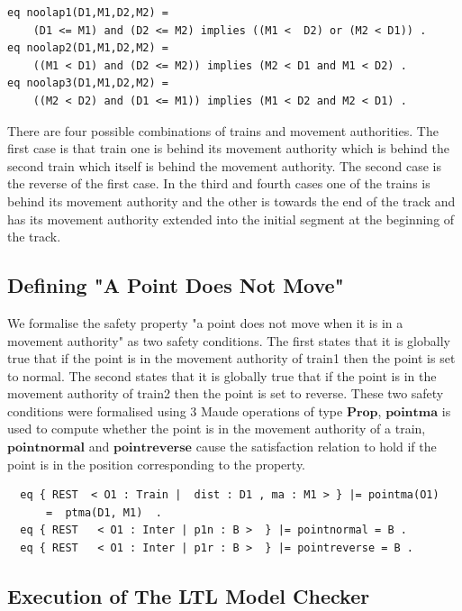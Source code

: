 \begin{lstlisting}[caption = The no overlap operations]
eq noolap1(D1,M1,D2,M2) = 
    (D1 <= M1) and (D2 <= M2) implies ((M1 <  D2) or (M2 < D1)) .  
eq noolap2(D1,M1,D2,M2) = 
    ((M1 < D1) and (D2 <= M2)) implies (M2 < D1 and M1 < D2) .
eq noolap3(D1,M1,D2,M2) = 
    ((M2 < D2) and (D1 <= M1)) implies (M1 < D2 and M2 < D1) .

\end{lstlisting}

There are four possible combinations of trains and movement authorities.  The first case is that train one is behind its movement authority which is behind the second train which itself is behind the movement authority. The second case is the reverse of the first case. In the third and fourth cases  one of the trains is behind its movement authority and the other is towards the end of the track and has its movement authority extended into the initial segment at the beginning of the track.


\subsection*{Defining "A Point Does Not Move"}
We formalise the safety property "a point does not move when it is in a movement authority" as two safety conditions. The first states that it is globally true that if the point is in the movement authority of train1 then the point is set to normal. The second states that it is globally true that if the point is in the movement authority of train2 then the point is set to reverse. These two safety conditions were formalised using 3 Maude operations of type $\mathbf{Prop}$, $\mathbf{pointma}$ is used to compute whether the point is in the movement authority of a train, $\mathbf{pointnormal}$ and $\mathbf{pointreverse}$ cause the satisfaction relation to hold if the point is in the position corresponding to the property. 

\begin{lstlisting}
  eq { REST  < O1 : Train |  dist : D1 , ma : M1 > } |= pointma(O1) 
      =  ptma(D1, M1)  .
  eq { REST   < O1 : Inter | p1n : B >  } |= pointnormal = B .
  eq { REST   < O1 : Inter | p1r : B >  } |= pointreverse = B .
\end{lstlisting}

\subsection{Execution of The LTL Model Checker}

